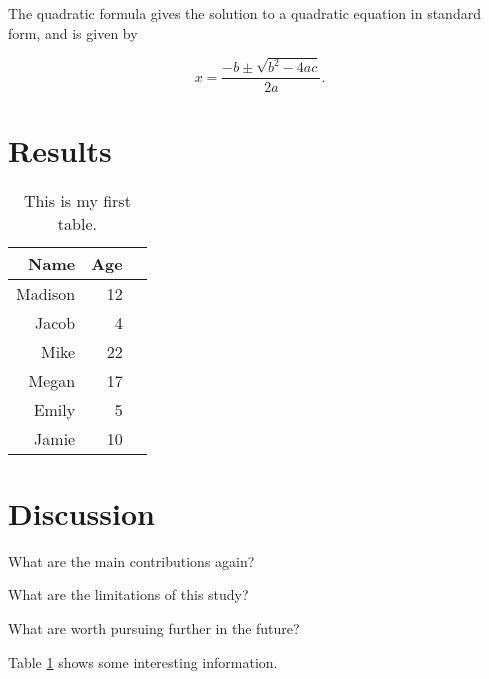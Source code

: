 \documentclass[12pt]{article}
\begin{document}
 The quadratic formula gives the solution to a quadratic equation in standard form, and is given by 

 \begin{equation}
    \label{eq:quadratic}
   x=\frac{-b\pm\sqrt{b^2-4ac}}{2a}.
   \end{equation}
  \citet{MindYourDecisions}

 \section{Results}
 \label{sec:results}

 \begin{table}[h]
    \caption{This is my first table.}
    \label{tab:rv}
  \centering
  \begin{tabular}{rrr}
    \hline
  Name & Age \\ 
    \hline
    Madison & 12 \\ 
    Jacob & 4 \\ 
    Mike & 22 \\ 
    Megan & 17 \\ 
    Emily & 5 \\ 
    Jamie & 10 \\ 
     \hline
  \end{tabular}
  \end{table}

  \lipsum[1-3]

 \section{Discussion}
 \label{sec:disc}

 What are the main contributions again?

 What are the limitations of this study?

 What are worth pursuing further in the future?

 Table \ref{tab:rv} shows some interesting information.

 \lipsum[3]




 
\end{document}
